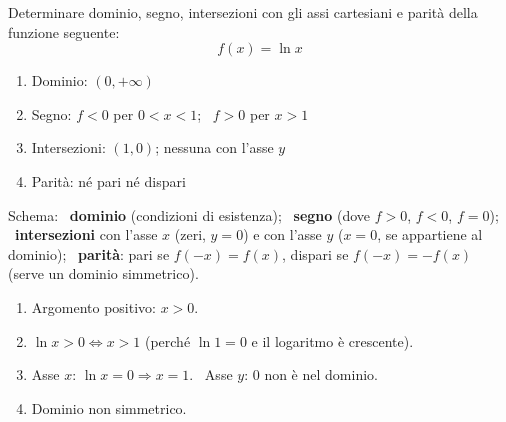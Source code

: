 \begin{question}[ID=1.7, subtitle={Studio di una funzione logaritmica}, difficulty=facile, tags={funzioni, studio di funzione, logaritmi}]
Determinare dominio, segno, intersezioni con gli assi cartesiani e parità della funzione seguente:
\begin{equation*}
    f(x)=\ln x
\end{equation*}
\begin{solution}
\begin{enumerate}
    \item Dominio: $(0,+\infty)$
    \item Segno: $f<0$ per $0<x<1$; \ $f>0$ per $x>1$
    \item Intersezioni: $(1,0)$; nessuna con l'asse $y$
    \item Parità: né pari né dispari
\end{enumerate}
\end{solution}
\begin{explanation}
Schema: \ \textbf{dominio} (condizioni di esistenza); \ \textbf{segno} (dove $f>0$, $f<0$, $f=0$); \ \textbf{intersezioni} con l'asse $x$ (zeri, $y=0$) e con l'asse $y$ ($x=0$, se appartiene al dominio); \ \textbf{parità}: pari se $f(-x)=f(x)$, dispari se $f(-x)=-f(x)$ (serve un dominio simmetrico).
\begin{enumerate}
    \item Argomento positivo: $x>0$.
    \item $\ln x>0 \iff x>1$ (perché $\ln1=0$ e il logaritmo è crescente).
    \item Asse $x$: $\ln x=0 \Rightarrow x=1$. \ Asse $y$: $0$ non è nel dominio.
    \item Dominio non simmetrico.
\end{enumerate}
\end{explanation}
\end{question}


